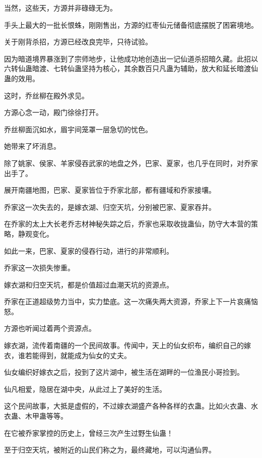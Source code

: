 
\begin{this_body}



当然，这些天，方源并非碌碌无为。

手头上最大的一批长恨蛛，刚刚售出，方源的红枣仙元储备彻底摆脱了困窘境地。

关于刚背杀招，方源已经改良完毕，只待试验。

因为暗道境界暴涨到了宗师地步，让他成功地创造出一记仙道杀招暗久藏。此招以六转仙蛊暗渡、七转仙蛊坚持为核心，其余数百只凡蛊为辅助，放大和延长暗渡仙蛊的效用。

这时，乔丝柳在殿外求见。

方源心念一动，殿门徐徐打开。

乔丝柳面沉如水，眉宇间笼罩一层急切的忧色。

她带来了坏消息。

除了姚家、侯家、羊家侵吞武家的地盘之外，巴家、夏家，也几乎在同时，对乔家出手了。

展开南疆地图，巴家、夏家皆位于乔家北部，都有疆域和乔家接壤。

乔家这一次失去的，是嫁衣湖、归空天坑，分别被巴家、夏家吞并。

在乔家的太上大长老乔志材神秘失踪之后，乔家也采取收拢蛊仙，防守大本营的策略，静观变化。

如此一来，巴家、夏家的侵吞行动，进行的非常顺利。

乔家这一次损失惨重。

嫁衣湖和归空天坑，都是价值超过血潮天坑的资源点。

乔家在正道超级势力当中，实力垫底。这一次痛失两大资源，乔家上下一片哀痛恼怒。

方源也听闻过着两个资源点。

嫁衣湖，流传着南疆的一个民间故事。传闻中，天上的仙女织布，编织自己的嫁衣，谁若能得到，就能成为仙女的丈夫。

仙女编织好嫁衣之后，投到了这片湖中，被生活在湖畔的一位渔民小哥捡到。

仙凡相爱，隐居在湖中央，从此过上了美好的生活。

这个民间故事，大抵是虚假的，不过嫁衣湖盛产各种各样的衣蛊。比如火衣蛊、水衣蛊、木甲蛊等等。

在它被乔家掌控的历史上，曾经三次产生过野生仙蛊！

至于归空天坑，被附近的山民们称之为，最终藏地，可以沟通仙界。


\end{this_body}
